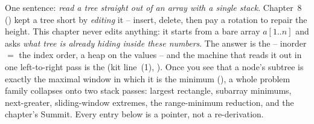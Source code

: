 

One sentence: \emph{read a tree straight out of an array with a single stack}. Chapter~8 ()
kept a tree short by \emph{editing} it -- insert, delete, then pay a rotation to repair the height. This
chapter never edits anything: it starts from a bare array $a[1..n]$ and asks \emph{what tree is already
hiding inside these numbers}. The answer is the  -- inorder $=$ the index order, a
heap on the values -- and the machine that reads it out in one left-to-right pass is the  (kit line~(1), ). Once you see that a node's subtree is exactly the maximal window in which
it is the minimum (), a whole problem family collapses onto two stack passes: largest
rectangle, subarray minimums, next-greater, sliding-window extremes, the range-minimum reduction, and the
chapter's Summit. Every entry below is a pointer, not a re-derivation.


